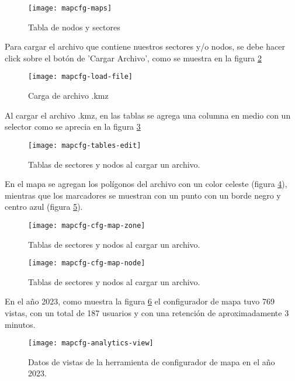 \begin{figure}[H]
	\centering
	\texttt{[image: mapcfg-maps]}
	\caption{\label{fig:mapcfg-maps} Tabla de nodos y sectores}
\end{figure}

Para cargar el archivo que contiene nuestros sectores y/o nodos, se debe hacer click sobre el botón de 'Cargar Archivo', como se muestra en la figura \ref{fig:mapcfg-load-file}

\begin{figure}[H]
	\centering
	\texttt{[image: mapcfg-load-file]}
	\caption{\label{fig:mapcfg-load-file} Carga de archivo .kmz}
\end{figure}

Al cargar el archivo .kmz, en las tablas se agrega una columna en medio con un selector como se aprecia en la figura \ref{fig:mapcfg-tables-edit}

\begin{figure}[H]
	\centering
	\texttt{[image: mapcfg-tables-edit]}
	\caption{\label{fig:mapcfg-tables-edit} Tablas de sectores y nodos al cargar un archivo.}
\end{figure}

En el mapa se agregan los polígonos del archivo con un color celeste (figura \ref{fig:mapcfg-cfg-map-zone}), mientras que los marcadores se muestran con un punto con un borde negro y centro azul (figura \ref{fig:mapcfg-cfg-map-node}).

\begin{figure}[H]
	\centering
	\texttt{[image: mapcfg-cfg-map-zone]}
	\caption{\label{fig:mapcfg-cfg-map-zone} Tablas de sectores y nodos al cargar un archivo.}
\end{figure}

\begin{figure}[H]
	\centering
	\texttt{[image: mapcfg-cfg-map-node]}
	\caption{\label{fig:mapcfg-cfg-map-node} Tablas de sectores y nodos al cargar un archivo.}
\end{figure}


En el año 2023, como muestra la figura \ref{fig:mapcfg-analytics-view} el configurador de mapa tuvo 769 vistas, con un total de 187 usuarios y con una retención de aproximadamente 3 minutos.
\begin{figure}[H]
	\centering
	\texttt{[image: mapcfg-analytics-view]}
	\caption{\label{fig:mapcfg-analytics-view} Datos de vistas de la herramienta de configurador de mapa en el año 2023.}
\end{figure}
\iffalse
